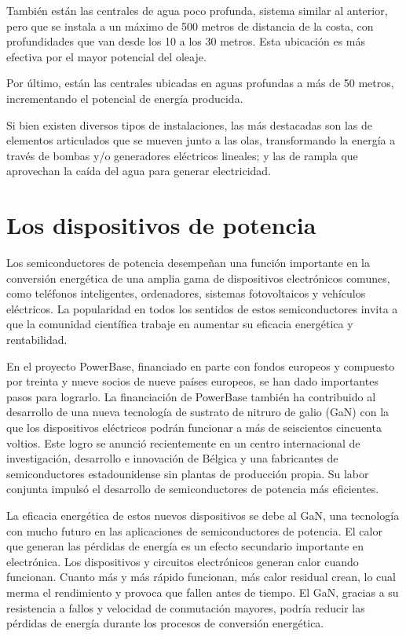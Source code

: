 \documentclass[12pt,letterpaper,superscriptaddress]{article}
\begin{document}
También están las centrales de agua poco profunda, sistema similar al anterior, pero que se instala a un máximo de 500 metros de distancia de la costa, con profundidades que van desde los 10 a los 30 metros. Esta ubicación es más efectiva por el mayor potencial del oleaje.

Por último, están las centrales ubicadas en aguas profundas a más de 50 metros, incrementando el potencial de energía producida.

Si bien existen diversos tipos de instalaciones, las más destacadas son las de elementos articulados que se mueven junto a las olas, transformando la energía a través de bombas y/o generadores eléctricos lineales; y las de rampla que aprovechan la caída del agua para generar electricidad.



\section{Los dispositivos de potencia}

Los semiconductores de potencia desempeñan una función importante en la conversión energética de una amplia gama de dispositivos electrónicos comunes, como teléfonos inteligentes, ordenadores, sistemas fotovoltaicos y vehículos eléctricos. La popularidad en todos los sentidos de estos semiconductores invita a que la comunidad científica trabaje en aumentar su eficacia energética y rentabilidad.

En el proyecto PowerBase, financiado en parte con fondos europeos y compuesto por treinta y nueve socios de nueve países europeos, se han dado importantes pasos para lograrlo. La financiación de PowerBase también ha contribuido al desarrollo de una nueva tecnología de sustrato de nitruro de galio (GaN) con la que los dispositivos eléctricos podrán funcionar a más de seiscientos cincuenta voltios. Este logro se anunció recientemente en un centro internacional de investigación, desarrollo e innovación de Bélgica y una fabricantes de semiconductores estadounidense sin plantas de producción propia. Su labor conjunta impulsó el desarrollo de semiconductores de potencia más eficientes.

La eficacia energética de estos nuevos dispositivos se debe al GaN, una tecnología con mucho futuro en las aplicaciones de semiconductores de potencia. El calor que generan las pérdidas de energía es un efecto secundario importante en electrónica. Los dispositivos y circuitos electrónicos generan calor cuando funcionan. Cuanto más y más rápido funcionan, más calor residual crean, lo cual merma el rendimiento y provoca que fallen antes de tiempo. El GaN, gracias a su resistencia a fallos y velocidad de conmutación mayores, podría reducir las pérdidas de energía durante los procesos de conversión energética.
\end{document}
